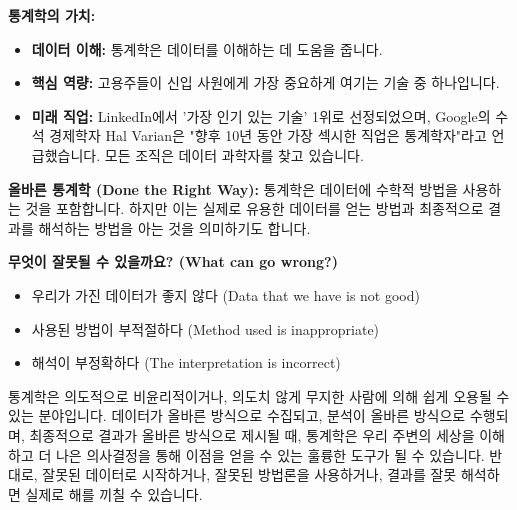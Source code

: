 \documentclass[11pt,a4paper]{article}
\begin{document}
\begin{summarybox}
\textbf{통계학의 가치:}
\begin{itemize}
    \item \textbf{데이터 이해:} 통계학은 데이터를 이해하는 데 도움을 줍니다.
    \item \textbf{핵심 역량:} 고용주들이 신입 사원에게 가장 중요하게 여기는 기술 중 하나입니다.
    \item \textbf{미래 직업:} LinkedIn에서 '가장 인기 있는 기술' 1위로 선정되었으며, Google의 수석 경제학자 Hal Varian은 "향후 10년 동안 가장 섹시한 직업은 통계학자"라고 언급했습니다. 모든 조직은 데이터 과학자를 찾고 있습니다.
\end{itemize}
\end{summarybox}

\begin{tcolorbox}[title={그렇다면 통계학이란 무엇일까요? (So What is Statistics?)}]
\textbf{올바른 통계학 (Done the Right Way):}
통계학은 데이터에 수학적 방법을 사용하는 것을 포함합니다. 하지만 이는 실제로 유용한 데이터를 얻는 방법과 최종적으로 결과를 해석하는 방법을 아는 것을 의미하기도 합니다.

\textbf{무엇이 잘못될 수 있을까요? (What can go wrong?)}
\begin{itemize}
    \item 우리가 가진 데이터가 좋지 않다 (Data that we have is not good)
    \item 사용된 방법이 부적절하다 (Method used is inappropriate)
    \item 해석이 부정확하다 (The interpretation is incorrect)
\end{itemize}
통계학은 의도적으로 비윤리적이거나, 의도치 않게 무지한 사람에 의해 쉽게 오용될 수 있는 분야입니다. 데이터가 올바른 방식으로 수집되고, 분석이 올바른 방식으로 수행되며, 최종적으로 결과가 올바른 방식으로 제시될 때, 통계학은 우리 주변의 세상을 이해하고 더 나은 의사결정을 통해 이점을 얻을 수 있는 훌륭한 도구가 될 수 있습니다. 반대로, 잘못된 데이터로 시작하거나, 잘못된 방법론을 사용하거나, 결과를 잘못 해석하면 실제로 해를 끼칠 수 있습니다.
\end{tcolorbox}
\end{document}
